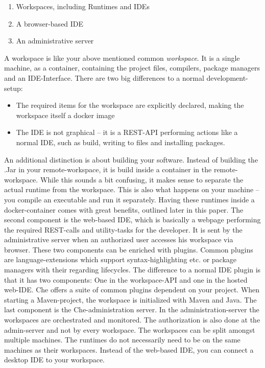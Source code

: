 \documentclass[utf8]{lni}
\begin{document}
\begin{enumerate}
	\item Workspaces, including Runtimes and IDEs
	\item A browser-based IDE
	\item An administrative server
\end{enumerate}
A workspace is like your above mentioned common \textit{workspace}. 
It is a single machine, as a container, containing the project files, compilers, package managers and an IDE-Interface. 
There are two big differences to a normal development-setup:
\begin{itemize}
	\item The required items for the workspace are explicitly  declared, making  the  workspace itself a docker image
	\item The IDE is not graphical – it is a REST-API performing actions like a normal IDE, such as build, writing to files and installing packages.  
\end{itemize}
An additional distinction is about building your software.
Instead of building the .Jar in your remote-workspace, it is build inside a container in the remote-workspace.
While this sounds a bit confusing, it makes sense to separate the actual runtime from the workspace. 
This is also what happens on your machine – you compile an executable and run it separately. 
Having these runtimes inside a docker-container comes with great benefits, outlined later in this paper.
The second component is the web-based IDE, which is basically a webpage performing the required REST-calls and utility-tasks for the developer. 
It is sent by the administrative server when an authorized user accesses his workspace via browser. 
These two components can be enriched with plugins.  
Common plugins are language-extensions which support syntax-highlighting etc. or package managers with their regarding lifecycles.
The difference to a normal IDE plugin is that it has two components: 
One in the workspace-API and one in the hosted web-IDE.  
Che offers a suite of common plugins dependent on your project. 
When starting a Maven-project, the workspace is initialized with Maven and Java.
The last component is the Che-administration server. 
In the administration-server the workspaces are orchestrated and monitored. 
The authorization is also done at the admin-server and not by every workspace.
The workspaces can be split amongst multiple machines.
The runtimes do not necessarily need to be on the same machines as their workspaces. 
Instead of the web-based IDE, you can connect a desktop IDE to your workspace. 
\end{document}
